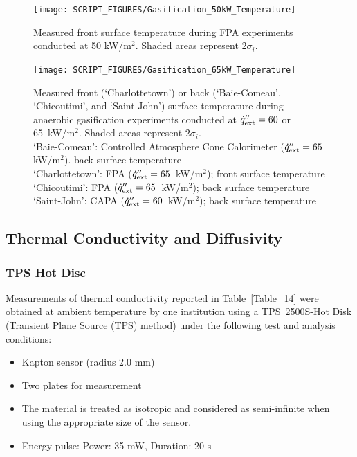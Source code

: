 \documentclass{book}
\begin{document}
\begin{figure}
  \centering
  \texttt{[image: SCRIPT\_FIGURES/Gasification\_50kW\_Temperature]}
  \caption{Measured front surface temperature during FPA experiments conducted at 50 kW/m$^2$. Shaded areas represent $2\sigma_i$.}
  \label{Fig:Gasification_50kW_Temperature}
\end{figure}

\begin{figure}
  \centering
  \texttt{[image: SCRIPT\_FIGURES/Gasification\_65kW\_Temperature]}
  \caption{Measured front (‘Charlottetown’) or back (‘Baie-Comeau’, ‘Chicoutimi’, and ‘Saint John’) surface temperature during anaerobic gasification experiments conducted at $\dot{q}_{\rm ext}'' = 60$ or 65~kW/m$^2$. Shaded areas represent $2\sigma_i$. \\
 ‘Baie-Comeau’:  Controlled Atmosphere Cone Calorimeter ($\dot{q}_{\rm ext}'' = 65$ kW/m$^2$). back surface temperature \\
‘Charlottetown’:  FPA ($\dot{q}_{\rm ext}'' = 65$~kW/m$^2$); front surface temperature \\
‘Chicoutimi’:   FPA ($\dot{q}_{\rm ext}'' = 65$~kW/m$^2$); back surface temperature  \\
‘Saint-John’:   CAPA ($\dot{q}_{\rm ext}'' = 60$~kW/m$^2$); back surface temperature}
  \label{Fig:Gasification_65kW_Temperature}
\end{figure}


\subsection{Thermal Conductivity and Diffusivity}

\subsubsection{TPS Hot Disc}

Measurements of thermal conductivity reported in Table~\ref{Table_14} were obtained at ambient temperature by one institution using a TPS~2500S-Hot Disk (Transient Plane Source (TPS) method) under the following test and analysis conditions:
\begin{itemize}
 \item Kapton sensor (radius 2.0 mm)
 \item Two plates for measurement
 \item The material is treated as isotropic and considered as semi-infinite when using the appropriate size of the sensor.
 \item Energy pulse: Power: 35 mW, Duration: 20 s
\end{itemize}
\end{document}
